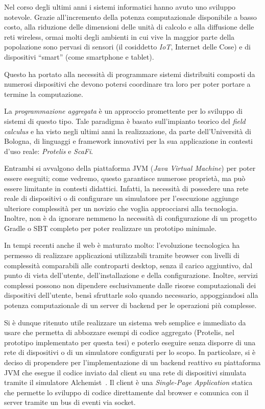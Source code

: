 \label{ch:intro}

Nel corso degli ultimi anni i sistemi informatici hanno avuto uno sviluppo notevole.
Grazie all'incremento della potenza computazionale disponibile a basso costo, alla riduzione delle dimensioni delle unità di calcolo e alla diffusione delle reti wireless,
ormai molti degli ambienti in cui vive la maggior parte della popolazione sono pervasi di sensori (il cosiddetto \emph{IoT}, Internet delle Cose) e di dispositivi ``smart'' (come smartphone e tablet).

Questo ha portato alla necessità di programmare sistemi distribuiti composti da numerosi dispositivi che devono potersi coordinare tra loro
per poter portare a termine la computazione.

La \emph{programmazione aggregata} è un approccio promettente per lo sviluppo di sistemi di questo tipo.
Tale paradigma è basato sull'impianto teorico del \emph{field calculus} e ha visto negli ultimi anni la realizzazione,
da parte dell'Università di Bologna, di linguaggi e framework innovativi per la sua applicazione in contesti d'uso reale:
\emph{Protelis} e \emph{ScaFi}.

Entrambi si avvalgono della piattaforma JVM (\emph{\emph{J}ava \emph{V}irtual \emph{M}achine}) per poter essere eseguiti;
come vedremo, questo garantisce numerose proprietà, ma può essere limitante in contesti didattici.
Infatti, la necessità di possedere una rete reale di dispositivi o di configurare un simulatore per l'esecuzione
aggiunge ulteriore complessità per un novizio che voglia approcciarsi alla tecnologia.
Inoltre, non è da ignorare nemmeno la necessità di configurazione di un progetto Gradle o SBT completo per poter realizzare un prototipo minimale.

In tempi recenti anche il web è maturato molto:
l'evoluzione tecnologica ha permesso di realizzare applicazioni utilizzabili tramite browser con livelli di complessità comparabili alle controparti desktop,
senza il carico aggiuntivo, dal punto di vista dell'utente, dell'installazione e della configurazione.
Inoltre, servizi complessi possono non dipendere esclusivamente dalle risorse computazionali dei dispositivi dell'utente,
bensì sfruttarle solo quando necessario, appoggiandosi alla potenza computazionale di un server di backend per le operazioni più complesse.

Si è dunque ritenuto utile realizzare un sistema web semplice e immediato da usare che permetta di abbozzare esempi di codice aggregato
(Protelis, nel prototipo implementato per questa tesi) e poterlo eseguire senza disporre di una rete di dispositivi o di un simulatore configurati per lo scopo.
In particolare, si è deciso di propendere per l'implementazione di un backend reattivo su piattaforma JVM che esegue il codice inviato dal client su una rete di dispositivi simulata tramite il simulatore Alchemist~\cite{alchemist-jos2013}.
Il client è una \emph{Single-Page Application} statica che permette lo sviluppo di codice direttamente dal browser e comunica con il server tramite un bus di eventi via socket.

